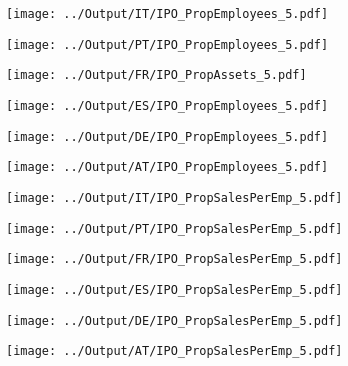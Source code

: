 \documentclass[12pt,notitlepage]{article}
\begin{document}
\FloatBarrier
\begin{figure}[!htpb]
\centering
\caption{Asset Growth Over IPOs}
\begin{subfigure}{.49\textwidth}
    \centering
 \texttt{[image: ../Output/IT/IPO\_PropEmployees\_5.pdf]}
\end{subfigure}%
\begin{subfigure}{.49\textwidth}
    \centering
 \texttt{[image: ../Output/PT/IPO\_PropEmployees\_5.pdf]}
\end{subfigure}
\begin{subfigure}{.49\textwidth}
    \centering
 \texttt{[image: ../Output/FR/IPO\_PropAssets\_5.pdf]}
\end{subfigure}%
\begin{subfigure}{.49\textwidth}
    \centering
 \texttt{[image: ../Output/ES/IPO\_PropEmployees\_5.pdf]}
\end{subfigure}
\begin{subfigure}{.49\textwidth}
    \centering
 \texttt{[image: ../Output/DE/IPO\_PropEmployees\_5.pdf]}
\end{subfigure}
\begin{subfigure}{.49\textwidth}
    \centering
 \texttt{[image: ../Output/AT/IPO\_PropEmployees\_5.pdf]}
\end{subfigure}
\end{figure}



\FloatBarrier
\begin{figure}[!htpb]
\centering
\caption{Sales Per Employee Growth Over IPOs}
\begin{subfigure}{.49\textwidth}
    \centering
 \texttt{[image: ../Output/IT/IPO\_PropSalesPerEmp\_5.pdf]}
\end{subfigure}%
\begin{subfigure}{.49\textwidth}
    \centering
 \texttt{[image: ../Output/PT/IPO\_PropSalesPerEmp\_5.pdf]}
\end{subfigure}
\begin{subfigure}{.49\textwidth}
    \centering
 \texttt{[image: ../Output/FR/IPO\_PropSalesPerEmp\_5.pdf]}
\end{subfigure}%
\begin{subfigure}{.49\textwidth}
    \centering
 \texttt{[image: ../Output/ES/IPO\_PropSalesPerEmp\_5.pdf]}
\end{subfigure}
\begin{subfigure}{.49\textwidth}
    \centering
 \texttt{[image: ../Output/DE/IPO\_PropSalesPerEmp\_5.pdf]}
\end{subfigure}
\begin{subfigure}{.49\textwidth}
    \centering
 \texttt{[image: ../Output/AT/IPO\_PropSalesPerEmp\_5.pdf]}
\end{subfigure}
\end{figure}
\end{document}
